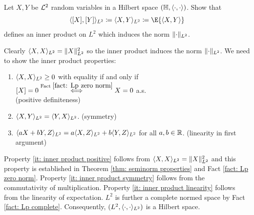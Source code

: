 \begin{exercise}
    \label{ex: L2 hilbert space}
    Let \(X,Y\) be \(\mathcal{L}^2\) random variables in a Hilbert space \((\mathbb{H}, \langle\cdot, \cdot\rangle)\).
    Show that 
    \[
        \langle [X], [Y] \rangle_{L^2} \coloneq \langle X, Y\rangle_{L^2} \coloneq \E{\scp{X,Y}}
    \]
    defines an inner product on \(L^2\) which induces the norm \(\lVert\cdot\rVert_{L^2}\).
    \begin{solution}
        Clearly \(\langle X, X\rangle_{L^2} = \lVert X\rVert_{L^2}^2\) so the inner product induces
        the norm \(\lVert\cdot\rVert_{L^2}\). We need to show the inner product properties:
        \begin{enumerate}[label=(\roman*)]
            \item\label{it: inner product positive}
            \(\langle X, X\rangle_{L^2} \ge 0\) with equality if and only if \([X]=0 \overset{\text{Fact } \ref{fact: Lp zero norm}}\iff X=0\) a.s.
            \\ \null \hfill (positive definiteness)
            \item\label{it: inner product symmetry}
            \(\langle X, Y\rangle_{L^2} = \langle Y, X\rangle_{L^2}\).
            \hfill (symmetry)
            \item\label{it: inner product linearity}
            \(\langle aX + bY, Z\rangle_{L^2} = a \langle X, Z\rangle_{L^2} + b \langle Y, Z\rangle_{L^2}\)
            for all \(a,b\in \mathbb{R}\).
            \hfill (linearity in first argument)
        \end{enumerate}
        Property \ref{it: inner product positive} follows from \(\langle X, X\rangle_{L^2} = \lVert X\rVert_{L^2}^2\)
        and this property is established in Theorem \ref{thm: seminorm properties} and
        Fact \ref{fact: Lp zero norm}.
        Property \ref{it: inner product symmetry} follows from the
        commutativity of multiplication. Property \ref{it: inner product linearity}
        follows from the linearity of expectation.
        \(L^2\) is further a complete normed space by Fact \ref{fact: Lp complete}.
        Consequently, \((L^2, \langle\cdot, \cdot\rangle_{L^2})\) is a Hilbert space.
    \end{solution}
\end{exercise}

